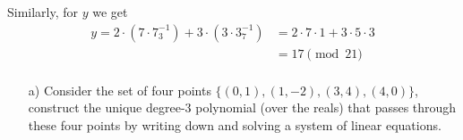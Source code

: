 \documentclass[]{article}
\begin{document}
\begin{qunlist}
{{\begin{enumerate}
Similarly, for $y$ we get
\begin{align*}
y = 2 \cdot (7 \cdot 7^{-1}_3) + 3 \cdot( 3 \cdot 3^{-1}_7) &= 2 \cdot 7 \cdot 1 + 3 \cdot 5 \cdot 3 \\
&= \boxed{17 \pmod{21}} \\
\end{align*}

  \end{enumerate}
}}\fi




\begin{itemize}
\qpart
\item[a)] Consider the set of four points $\{(0,1), (1,-2), (3,4), (4,0)\}$, construct the unique degree-$3$ polynomial (over the reals) that passes through these four points by writing down and solving a system of linear equations.



\end{itemize}
\end{qunlist}
\end{document}
